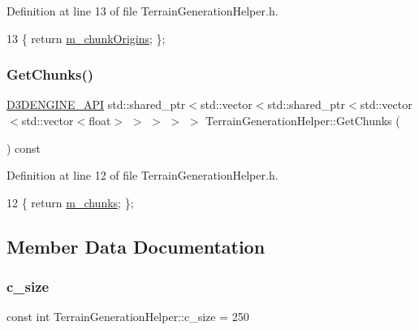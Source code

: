 Definition at line 13 of file Terrain\+Generation\+Helper.\+h.


\begin{DoxyCode}
13 \{ \textcolor{keywordflow}{return} \mbox{\hyperlink{class_terrain_generation_helper_a54b02e81523e592c5f36646731cd5a68}{m\_chunkOrigins}}; \};
\end{DoxyCode}
\mbox{\label{class_terrain_generation_helper_ab15c104c37244b4a8cea90da6a771b53}} 
\subsubsection{\texorpdfstring{Get\+Chunks()}{GetChunks()}}
{\footnotesize\ttfamily \mbox{\hyperlink{stdafx_8h_a8ee2d990c5dfba7794dd2b60741d7722}{D3\+D\+E\+N\+G\+I\+N\+E\+\_\+\+A\+PI}} std\+::shared\+\_\+ptr$<$std\+::vector$<$std\+::shared\+\_\+ptr$<$std\+::vector$<$std\+::vector$<$float$>$ $>$ $>$ $>$ $>$ Terrain\+Generation\+Helper\+::\+Get\+Chunks (\begin{DoxyParamCaption}{ }\end{DoxyParamCaption}) const\hspace{0.3cm}{\ttfamily [inline]}}



Definition at line 12 of file Terrain\+Generation\+Helper.\+h.


\begin{DoxyCode}
12 \{ \textcolor{keywordflow}{return} \mbox{\hyperlink{class_terrain_generation_helper_ab5a4b915382e685454f5fe7f6081bc08}{m\_chunks}}; \};
\end{DoxyCode}


\subsection{Member Data Documentation}
\mbox{\label{class_terrain_generation_helper_a2e182f64a684cc0cf248f2f940cc36dc}} 
\subsubsection{\texorpdfstring{c\+\_\+size}{c\_size}}
{\footnotesize\ttfamily const int Terrain\+Generation\+Helper\+::c\+\_\+size = 250\hspace{0.3cm}{\ttfamily [private]}}



